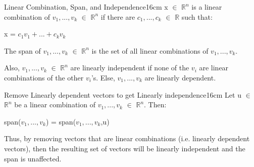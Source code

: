     \begin{definition}{Linear Combination, Span, and Independence}{16cm}
        x $\in$ $\mathbb{R}^n$ is a {\color{lblue} linear combination}
        of $v_1,...,v_k$ $\in$ $\mathbb{R}^n$ if there are
        $c_1,...,c_k$ $\in$ $\mathbb{R}$ such that:

        \hspace{0.5cm}
        x = $c_1v_1 + ... + c_kv_k$

        The {\color{lblue} span} of $v_1,...,v_k$ $\in$ $\mathbb{R}^n$ is the
        set of all linear combinations of $v_1,...,v_k$.

        Also, $v_1,...,v_k$ $\in$ $\mathbb{R}^n$ are
        {\color{lblue} linearly independent}
        if none of the $v_i$ are linear combinations of the other $v_i$'s.
        Else, $v_1,...,v_k$ are {\color{lblue} linearly dependent}.
    \end{definition}

    \newpage



    \begin{wtheorem}{Remove Linearly dependent vectors to get
    Linearly independence}{16cm}
        Let u $\in$ $\mathbb{R}^n$ be a linear combination of
        $v_1,...,v_k$ $\in$ $\mathbb{R}^n$. Then:

        \hspace{0.5cm}
        span($v_1,...,v_k$) = span($v_1,...,v_k$,u)

        Thus, by removing vectors that are linear
        combinations (i.e. linearly dependent vectors),
        then the resulting set of vectors will be linearly independent and
        the span is unaffected.
    \end{wtheorem}

